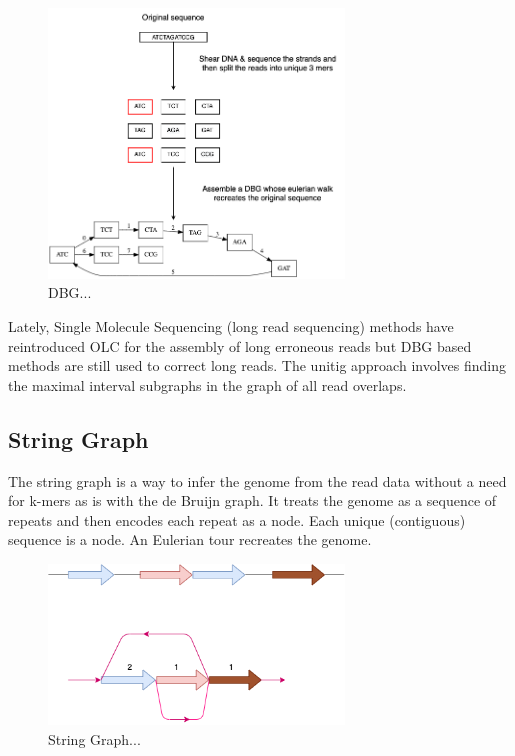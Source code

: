 \documentclass[11pt]{article}
\begin{document}
\begin{figure}[H]
\centering
\includegraphics[width=0.7\textwidth]{figures/de Bruijn Graph.png}
\caption{DBG...}
\end{figure}

Lately, Single Molecule Sequencing (long read sequencing)  methods have 
reintroduced OLC for the assembly of long erroneous reads but DBG based methods 
are still used to correct long reads.
The unitig approach involves finding the maximal interval subgraphs in the
graph of all read overlaps.

\subsection{String Graph}
\label{sec:orgd992e34}
The string graph \cite{myersFragmentAssemblyString2005} is a way to infer the 
genome from the read data without a need for k-mers as is with the de Bruijn 
graph.  It treats the genome as a sequence of repeats and then encodes each 
repeat as a node. Each unique (contiguous) sequence is a node. 
An Eulerian tour recreates the genome.

\begin{figure}[H]
\centering
\includegraphics[width=0.7\textwidth]{figures/String Graph.png}
\caption{String Graph...}
\end{figure}\label{string graph}
\end{document}
